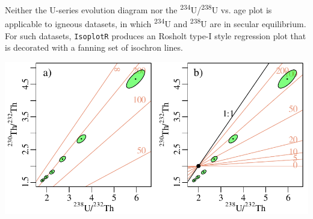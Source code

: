\begin{refsection}
Neither the U-series evolution diagram nor the
\textsuperscript{234}U/\textsuperscript{238}U vs. age plot is
applicable to igneous datasets, in which \textsuperscript{234}U and
\textsuperscript{238}U are in secular equilibrium.  For such datasets,
\texttt{IsoplotR} produces an Rosholt type-I style regression plot
that is decorated with a fanning set of isochron lines.\medskip

\noindent\begin{minipage}[t][][b]{.7\linewidth}
\includegraphics[width=\textwidth]{../figures/evolution34.pdf}
\end{minipage}
\begin{minipage}[t][][t]{.29\linewidth}
  \label{fig:evolution34}
\end{minipage}

\printbibliography[heading=subbibliography]

\end{refsection}
